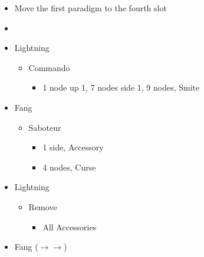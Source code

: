 \begin{menu}
	\begin{multicols}{2}
		\begin{itemize}
			\paradigm
			\begin{itemize}
				\item Move the first paradigm to the fourth slot
				\item {}%
				      {\paradigmline{(\rav)}{\syn}{\sab}}%
				      {\paradigmline{(\rav)}{\rav}{(\sab)}}%
				      {\paradigmline{(\rav)}{(\rav)}{\sen}}%
				      {\paradigmline[4]{\textit{\rav}}{\textit{\rav}}{\textit{\com}}}%
				      {\paradigmline{[\com]}{\rav}{\com}}%
				      {\paradigmline{[\com]}{\rav}{\com}}
			\end{itemize}
			\crystarium
			\begin{itemize}
				\item Lightning
				      \begin{itemize}
					      \item Commando
					            \begin{itemize}
						            \item 1 node up 1, 7 nodes side 1, 9 nodes, Smite
					            \end{itemize}
				      \end{itemize}
				\item Fang
				      \begin{itemize}
					      \item Saboteur
					            \begin{itemize}
						            \item 1 side, Accessory
						            \item 4 nodes, Curse
					            \end{itemize}
				      \end{itemize}
			\end{itemize}
			\columnbreak
			\equip
			\begin{itemize}
				\item Lightning
				      \begin{itemize}
					      \item Remove
					            \begin{itemize}
						            \item All Accessories
					            \end{itemize}
				      \end{itemize}
				\item Fang ($\rightarrow\rightarrow$)

\end{itemize}
\end{itemize}
\end{multicols}
\end{menu}
